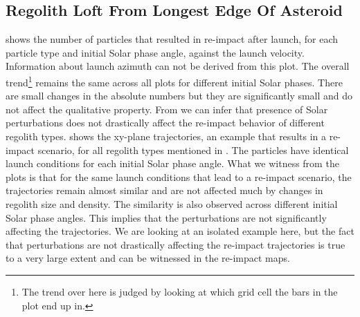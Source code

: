 \subsection{Regolith Loft From Longest Edge Of Asteroid}
\label{sec:general_char_longestEdge}
 shows the number of particles that resulted in re-impact after launch, for each particle type and initial Solar phase angle, against the launch velocity. Information about launch azimuth can not be derived from this plot. The overall trend\footnote{The trend over here is judged by looking at which grid cell the bars in the plot end up in.} remains the same across all plots for different initial Solar phases. There are small changes in the absolute numbers but they are significantly small and do not affect the qualitative property. From  we can infer that presence of Solar perturbations does not drastically affect the re-impact behavior of different regolith types.
%
\newline\newline
%
 shows the xy-plane trajectories, an example that results in a re-impact scenario, for all regolith types mentioned in . The particles have identical launch conditions for each initial Solar phase angle. What we witness from the plots is that for the same launch conditions that lead to a re-impact scenario, the trajectories remain almost similar and are not affected much by changes in regolith size and density. The similarity is also observed across different initial Solar phase angles. This implies that the perturbations are not significantly affecting the trajectories. We are looking at an isolated example here, but the fact that perturbations are not drastically affecting the re-impact trajectories is true to a very large extent and can be witnessed in the re-impact maps.
%
\newline\newline
%
